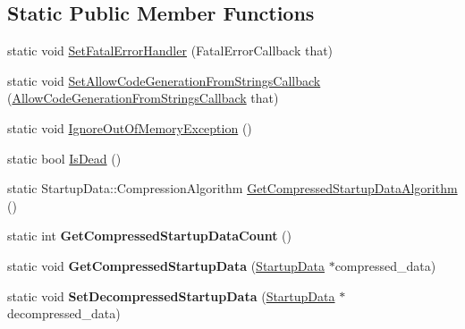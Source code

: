 \subsection*{Static Public Member Functions}
\begin{DoxyCompactItemize}
\item 
static void \hyperlink{classv8_1_1_v8_ab386f81a6d58dcf481d00446e8d15c9e}{Set\+Fatal\+Error\+Handler} (Fatal\+Error\+Callback that)
\item 
static void \hyperlink{classv8_1_1_v8_ad4abec314050af6e68df3a339634293e}{Set\+Allow\+Code\+Generation\+From\+Strings\+Callback} (\hyperlink{namespacev8_a521d909ec201742a1cb35d50a8e2a3c2}{Allow\+Code\+Generation\+From\+Strings\+Callback} that)
\item 
static void \hyperlink{classv8_1_1_v8_a1058ff39b32a17976df1e2b75c3d1cb4}{Ignore\+Out\+Of\+Memory\+Exception} ()
\item 
static bool \hyperlink{classv8_1_1_v8_a0d5593ecf0d41035e4d9ee512119f0b7}{Is\+Dead} ()
\item 
static Startup\+Data\+::\+Compression\+Algorithm \hyperlink{classv8_1_1_v8_a6d1b72d0cecdc64d0a0b8e784025b625}{Get\+Compressed\+Startup\+Data\+Algorithm} ()
\item 
\hypertarget{classv8_1_1_v8_ab598cfc79ebbc85fdeb2171b84ce53e6}{}static int {\bfseries Get\+Compressed\+Startup\+Data\+Count} ()\label{classv8_1_1_v8_ab598cfc79ebbc85fdeb2171b84ce53e6}

\item 
\hypertarget{classv8_1_1_v8_a736d6ddfdbbd72ca5838f931002334df}{}static void {\bfseries Get\+Compressed\+Startup\+Data} (\hyperlink{classv8_1_1_startup_data}{Startup\+Data} $\ast$compressed\+\_\+data)\label{classv8_1_1_v8_a736d6ddfdbbd72ca5838f931002334df}

\item 
\hypertarget{classv8_1_1_v8_a46d5618689f239b70425b8d7917cebf5}{}static void {\bfseries Set\+Decompressed\+Startup\+Data} (\hyperlink{classv8_1_1_startup_data}{Startup\+Data} $\ast$decompressed\+\_\+data)\label{classv8_1_1_v8_a46d5618689f239b70425b8d7917cebf5}


\end{DoxyCompactItemize}
